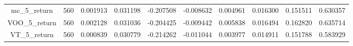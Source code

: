 \begin{appendices}
\begin{table}[ht]
\begin{adjustbox}{width=\textwidth}
\begin{tabular}{@{}clllllllll@{}}
    mc\_5\_return            & 560                                & 0.001913                          & 0.031198                         & -0.207508                        & -0.008632                         & 0.004961                          & 0.016300                          & 0.151511                         & 0.630357                                      \\
    VOO\_5\_return           & 560                                & 0.002128                          & 0.031036                         & -0.204425                        & -0.009442                         & 0.005838                          & 0.016494                          & 0.162820                         & 0.635714                                      \\
    VT\_5\_return            & 560                                & 0.000839                          & 0.030779                         & -0.214262                        & -0.011044                         & 0.003977                          & 0.014911                          & 0.151788                         & 0.583929                                      \\ \bottomrule
\end{tabular}
\end{adjustbox}
\label{tab:st_returns_stats_all}
\end{table}


\end{appendices}

